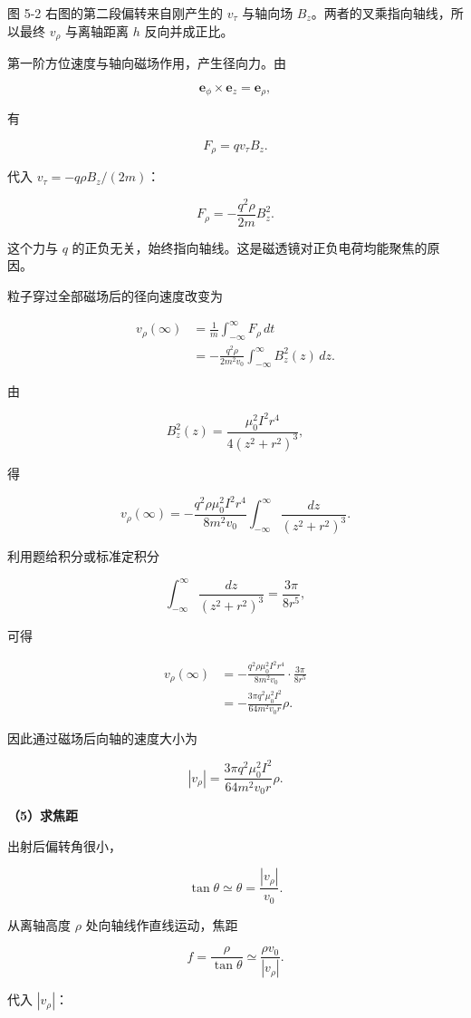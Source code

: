\documentclass[12pt,a4paper,UTF8]{ctexart}
\begin{document}
图 5-2 右图的第二段偏转来自刚产生的 \(v_\tau\) 与轴向场
\(B_z\)。两者的叉乘指向轴线，所以最终 \(v_\rho\) 与离轴距离 \(h\)
反向并成正比。

第一阶方位速度与轴向磁场作用，产生径向力。由

\[
\bm e_\phi\times\bm e_z=\bm e_\rho,
\]

有

\[
F_\rho=qv_\tau B_z.
\]

代入 \(v_\tau=-q\rho B_z/(2m)\)：

\[
\boxed{F_\rho=-\frac{q^2\rho}{2m}B_z^2}.
\]

这个力与 \(q\)
的正负无关，始终指向轴线。这是磁透镜对正负电荷均能聚焦的原因。

粒子穿过全部磁场后的径向速度改变为

\[
\begin{aligned}
v_\rho(\infty)
&=\frac1m\int_{-\infty}^{\infty}F_\rho\,dt\\
&=-\frac{q^2\rho}{2m^2v_0}
\int_{-\infty}^{\infty}B_z^2(z)\,dz.
\end{aligned}
\]

由

\[
B_z^2(z)=\frac{\mu_0^2I^2r^4}{4(z^2+r^2)^3},
\]

得

\[
v_\rho(\infty)
=-\frac{q^2\rho\mu_0^2I^2r^4}{8m^2v_0}
\int_{-\infty}^{\infty}\frac{dz}{(z^2+r^2)^3}.
\]

利用题给积分或标准定积分

\[
\int_{-\infty}^{\infty}\frac{dz}{(z^2+r^2)^3}
=\frac{3\pi}{8r^5},
\]

可得

\[
\begin{aligned}
v_\rho(\infty)
&=-\frac{q^2\rho\mu_0^2I^2r^4}{8m^2v_0}
\cdot\frac{3\pi}{8r^5}\\
&=-\frac{3\pi q^2\mu_0^2I^2}{64m^2v_0r}\rho.
\end{aligned}
\]

因此通过磁场后向轴的速度大小为

\[
\boxed{|v_\rho|=\frac{3\pi q^2\mu_0^2I^2}{64m^2v_0r}\rho}.
\]

\textbf{（5）求焦距}

出射后偏转角很小，

\[
\tan\theta\simeq\theta=\frac{|v_\rho|}{v_0}.
\]

从离轴高度 \(\rho\) 处向轴线作直线运动，焦距

\[
f=\frac{\rho}{\tan\theta}
\simeq\frac{\rho v_0}{|v_\rho|}.
\]

代入 \(|v_\rho|\)：
\end{document}
